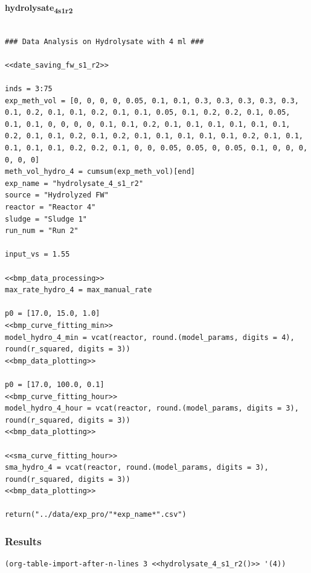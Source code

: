 \documentclass[11pt]{article}
\begin{document}
\textbf{hydrolysate\textsubscript{4}\textsubscript{s1}\textsubscript{r2}}
\begin{verbatim}

### Data Analysis on Hydrolysate with 4 ml ###

<<date_saving_fw_s1_r2>>

inds = 3:75
exp_meth_vol = [0, 0, 0, 0, 0.05, 0.1, 0.1, 0.3, 0.3, 0.3, 0.3, 0.3, 0.1, 0.2, 0.1, 0.1, 0.2, 0.1, 0.1, 0.05, 0.1, 0.2, 0.2, 0.1, 0.05, 0.1, 0.1, 0, 0, 0, 0, 0.1, 0.1, 0.2, 0.1, 0.1, 0.1, 0.1, 0.1, 0.1, 0.2, 0.1, 0.1, 0.2, 0.1, 0.2, 0.1, 0.1, 0.1, 0.1, 0.1, 0.2, 0.1, 0.1, 0.1, 0.1, 0.1, 0.2, 0.2, 0.1, 0, 0, 0.05, 0.05, 0, 0.05, 0.1, 0, 0, 0, 0, 0, 0]
meth_vol_hydro_4 = cumsum(exp_meth_vol)[end]
exp_name = "hydrolysate_4_s1_r2"
source = "Hydrolyzed FW"
reactor = "Reactor 4"
sludge = "Sludge 1"
run_num = "Run 2"

input_vs = 1.55

<<bmp_data_processing>>
max_rate_hydro_4 = max_manual_rate

p0 = [17.0, 15.0, 1.0]
<<bmp_curve_fitting_min>>
model_hydro_4_min = vcat(reactor, round.(model_params, digits = 4), round(r_squared, digits = 3))
<<bmp_data_plotting>>

p0 = [17.0, 100.0, 0.1]
<<bmp_curve_fitting_hour>>
model_hydro_4_hour = vcat(reactor, round.(model_params, digits = 3), round(r_squared, digits = 3))
<<bmp_data_plotting>>

<<sma_curve_fitting_hour>>
sma_hydro_4 = vcat(reactor, round.(model_params, digits = 3), round(r_squared, digits = 3))
<<bmp_data_plotting>>

return("../data/exp_pro/"*exp_name*".csv")
\end{verbatim}

\subsubsection{Results}
\label{sec:org8379963}

\begin{verbatim}
(org-table-import-after-n-lines 3 <<hydrolysate_4_s1_r2()>> '(4))
\end{verbatim}
\end{document}
